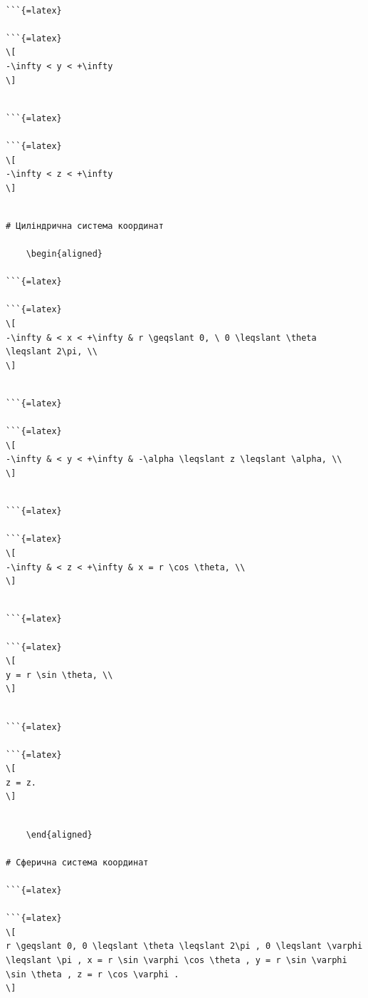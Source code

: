 \documentclass[
]{article}
\begin{document}
\begin{verbatim}

```{=latex}

```{=latex}
\[
-\infty < y < +\infty
\]
\end{verbatim}

\begin{verbatim}

```{=latex}

```{=latex}
\[
-\infty < z < +\infty
\]
\end{verbatim}

\begin{verbatim}

# Циліндрична система координат

    \begin{aligned}

```{=latex}

```{=latex}
\[
-\infty & < x < +\infty & r \geqslant 0, \ 0 \leqslant \theta \leqslant 2\pi, \\
\]
\end{verbatim}

\begin{verbatim}

```{=latex}

```{=latex}
\[
-\infty & < y < +\infty & -\alpha \leqslant z \leqslant \alpha, \\
\]
\end{verbatim}

\begin{verbatim}

```{=latex}

```{=latex}
\[
-\infty & < z < +\infty & x = r \cos \theta, \\
\]
\end{verbatim}

\begin{verbatim}

```{=latex}

```{=latex}
\[
y = r \sin \theta, \\
\]
\end{verbatim}

\begin{verbatim}

```{=latex}

```{=latex}
\[
z = z.
\]
\end{verbatim}

\begin{verbatim}

    \end{aligned}

# Сферична система координат

```{=latex}

```{=latex}
\[
r \geqslant 0, 0 \leqslant \theta \leqslant 2\pi , 0 \leqslant \varphi \leqslant \pi , x = r \sin \varphi \cos \theta , y = r \sin \varphi \sin \theta , z = r \cos \varphi .
\]
\end{verbatim}
\end{document}
